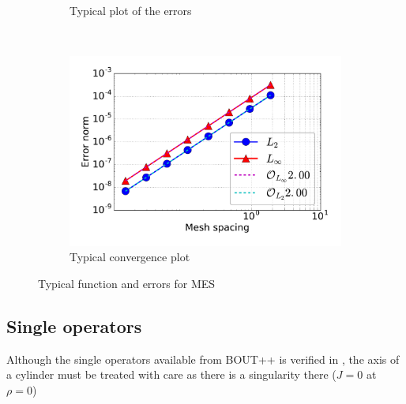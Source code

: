 \begin{figure}[t!]
\begin{subfigure}[t]{0.45\textwidth}
        \caption{Typical plot of the errors}
    \end{subfigure}
    ~
    \begin{subfigure}[t]{0.45\textwidth}
        \centering
        \includegraphics[width=1.0\textwidth]{fig/conv}
        \caption{Typical convergence plot}
    \end{subfigure}
    \caption{Typical function and errors for MES}
\end{figure}

\subsection{Single operators}
%
Although the single operators available from BOUT++ is verified in \cite{Dudson2016}, the axis of a cylinder must be treated with care as there is a singularity there ($J=0$ at $\rho=0$)

